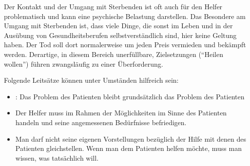 {Der Kontakt und der Umgang mit Sterbenden ist oft auch für
den Helfer problematisch und kann eine psychische Belastung
darstellen. Das Besondere am Umgang mit
Sterbenden ist, dass viele Dinge, die sonst im Leben und in
der Ausübung von Gesundheitsberufen selbstverständlich sind,
hier keine Geltung haben. Der Tod soll dort normalerweise um
jeden Preis vermieden und bekämpft werden. Derartige, in
diesem Bereich unerfüllbare, Zielsetzungen (\enquote{Heilen
wollen}) führen zwangsläufig zu einer Überforderung.

Folgende Leitsätze können unter Umständen hilfreich sein:

\begin{itemize}
  \item {}: Das Problem des
  Patienten bleibt grundsätzlich das Problem des Patienten
  \item Der Helfer muss im Rahmen der Möglichkeiten im Sinne
  des Patienten handeln und seine angemessenen
  Bedürfnisse befriedigen.
\item Man darf nicht seine eigenen Vorstellungen
  bezüglich der Hilfe mit denen des Patienten
  gleichstellen. Wenn man dem Patienten helfen möchte, muss
  man wissen, was  tatsächlich will.
\end{itemize}

}
{}
{}
{}
{}























